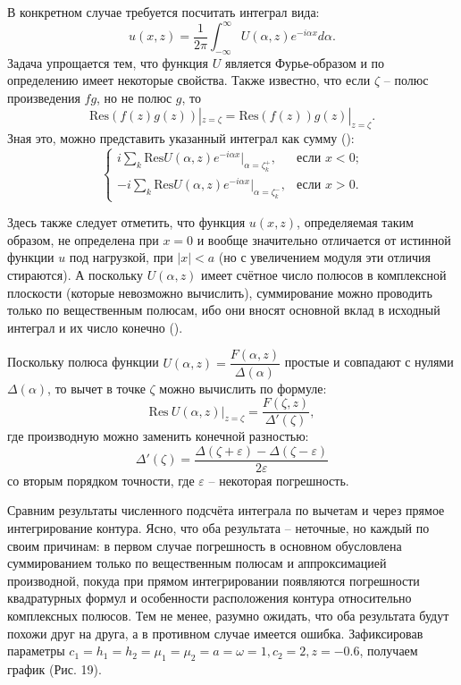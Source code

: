 \documentclass[a4paper, 12pt]{article}
\begin{document}
В конкретном случае требуется посчитать интеграл вида:
$$u(x,z)=\frac{1}{2\pi}\int^{\infty}_{-\infty} U(\alpha,z) e^{-i \alpha x } d\alpha.$$ 
Задача упрощается тем, что функция $U$ является Фурье-образом и по определению имеет некоторые свойства. Также известно, что если $\zeta$ -- полюс произведения $f g$, но не полюс $g$, то 
$$\mathrm{Res} \left(f(z)g(z)\right)|_{z=\zeta}=\mathrm{Res} \left(f(z)\right)g(z)|_{z=\zeta}.$$
Зная это, можно представить указанный интеграл как сумму (\cite{new}):
\[
\begin{cases}
i \sum_k \mathrm{Res}U(\alpha,z) e^{-i \alpha x}|_{\alpha=\zeta^+_k}, & \text{если $x<0$;} \\
-i \sum_k \mathrm{Res}U(\alpha,z) e^{-i \alpha x}|_{\alpha=\zeta^-_k}, & \text{если $x> 0$.}
\end{cases}
\]

Здесь также следует отметить, что функция $u(x,z)$, определяемая таким образом, не определена при $x=0$ и вообще значительно отличается от истинной функции $u$ под нагрузкой, при $|x|<a$ (но с увеличением модуля эти отличия стираются).
А поскольку $U(\alpha, z)$ имеет счётное число полюсов в комплексной плоскости (которые невозможно вычислить), суммирование можно проводить только по вещественным полюсам, ибо они вносят основной вклад в исходный интеграл и их число конечно (\cite{g89,new}).  

Поскольку полюса функции $U(\alpha,z)=\dfrac{F(\alpha,z)}{\Delta(\alpha)}$ простые и совпадают с нулями $\Delta(\alpha)$, то вычет в точке $\zeta$ можно вычислить по формуле:
$$\mathrm{Res} \ U(\alpha,z)|_{z=\zeta} =\dfrac{F(\zeta,z)}{\Delta' (\zeta)},$$
где производную можно заменить конечной разностью:
$$\Delta' (\zeta)=\dfrac{\Delta(\zeta + \varepsilon)-\Delta(\zeta- \varepsilon)}{2 \varepsilon}$$
со вторым порядком точности, где $\varepsilon$ -- некоторая погрешность.

Сравним результаты численного подсчёта интеграла по вычетам и через прямое интегрирование контура.
Ясно, что оба результата -- неточные, но каждый по своим причинам: в первом случае погрешность в основном обусловлена суммированием только по вещественным полюсам и аппроксимацией производной, покуда при прямом интегрировании появляются погрешности квадратурных формул и особенности расположения контура относительно комплексных полюсов.
Тем не менее, разумно ожидать, что оба результата будут похожи друг на друга, а в противном случае имеется ошибка. Зафиксировав параметры $c_1=h_1=h_2=\mu_1=\mu_2=a=\omega=1, c_2= 2, z=-0.6$, получаем график (Рис. 19).
\end{document}
